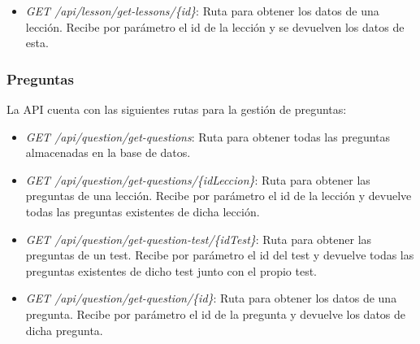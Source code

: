 \begin{itemize}
    \item \textit{GET /api/lesson/get-lessons/\{id\}}: Ruta para obtener los datos de una lección. Recibe por parámetro el id de la lección y se devuelven los datos de esta.
  \end{itemize}

\subsubsection{Preguntas}
\label{sec:preguntas}
La API cuenta con las siguientes rutas para la gestión de preguntas:

\begin{itemize}
  \item \textit{GET /api/question/get-questions}: Ruta para obtener todas las preguntas almacenadas en la base de datos.
  \item \textit{GET /api/question/get-questions/\{idLeccion\}}: Ruta para obtener las preguntas de una lección. Recibe por parámetro el id de la lección y devuelve todas las preguntas existentes de dicha lección.
  \item \textit{GET /api/question/get-question-test/\{idTest\}}: Ruta para obtener las preguntas de un test. Recibe por parámetro el id del test y devuelve todas las preguntas existentes de dicho test junto con el propio test.
  \item \textit{GET /api/question/get-question/\{id\}}: Ruta para obtener los datos de una pregunta. Recibe por parámetro el id de la pregunta y devuelve los datos de dicha pregunta.
\end{itemize}

